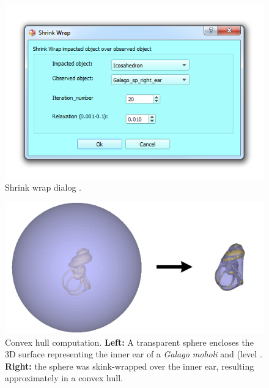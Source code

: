 \begin{figure}
  \centering
  \includegraphics[scale=0.5]{images/09/wrapping_methods/shrink_wrap_dialog.png} 
	\caption{Shrink wrap dialog .}
\label{shrink_wrap_dialog}
 
\end{figure}

\begin{figure}
  \centering
  \includegraphics[scale=0.45]{images/09/wrapping_methods/shrink_wrap_example.png} 
	\caption{Convex hull computation. \textbf{Left:} A transparent sphere encloses the 3D surface representing the inner ear of a \textit{Galago moholi} and (level . \textbf{Right:} the sphere was skink-wrapped over the inner ear, resulting approximately in a convex hull.}
\label{shrink_wrap_example}
 
\end{figure}



